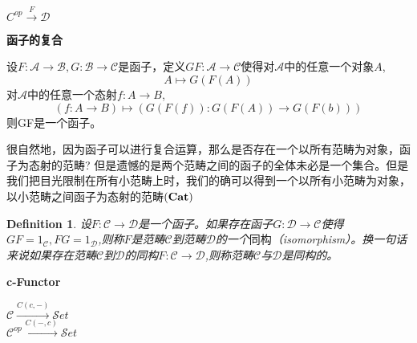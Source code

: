 \documentclass{article}
\newtheorem{definition}[theorem]{Definition}
\begin{document}
\begin{center}
$C^{op} \xrightarrow{F} \mathcal{D}$ \\
\end{center}

\begin{flushleft}
\textbf{函子的复合}
\end{flushleft}
设$F \colon \mathcal{A} \rightarrow \mathcal{B},G \colon \mathcal{B} \rightarrow \mathcal{C}$是函子，定义$GF \colon \mathcal{A} \rightarrow \mathcal{C}$使得对$\mathcal{A}$中的任意一个对象$A$,\[A \mapsto G(F(A))\]
对$\mathcal{A}$中的任意一个态射$f \colon A \rightarrow B$, \[(f \colon A \rightarrow B) \mapsto (G(F(f)) \colon G(F(A)) \rightarrow G(F(b))) \]则GF是一个函子。

很自然地，因为函子可以进行复合运算，那么是否存在一个以所有范畴为对象，函子为态射的范畴? 但是遗憾的是两个范畴之间的函子的全体未必是一个集合。但是我们把目光限制在所有小范畴上时，我们的确可以得到一个以所有小范畴为对象，以小范畴之间函子为态射的范畴$\bf(Cat)$

\begin{definition}
设$F \colon \mathcal{C} \rightarrow \mathcal{D}$是一个函子。如果存在函子$G \colon \mathcal{D} \rightarrow \mathcal{C}$使得$GF=1_{\mathcal{C}},FG = 1_{\mathcal{D}}$,则称$F$是范畴$\mathcal{C}$到范畴$\mathcal{D}$的一个$\textbf{同构}$（isomorphism）。换一句话来说如果存在范畴$\mathcal{C}$到$\mathcal{D}$的同构$F \colon \mathcal{C} \rightarrow \mathcal{D}$,则称范畴$\mathcal{C}$与$\mathcal{D}$是同构的。
\end{definition}



\begin{flushleft}
\textbf{c-Functor} \\
\begin{center}
$\mathcal{C} \xrightarrow{C(c,-)} \mathcal{S}et$ \\
$\mathcal{C}^{op} \xrightarrow{C(-,c)} \mathcal{S}et$ \\
\end{center}
\end{flushleft}
\end{document}
